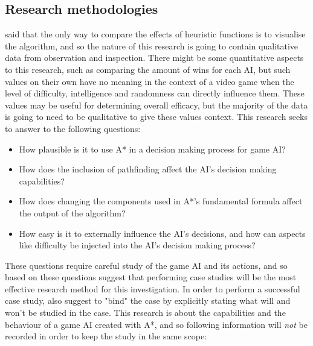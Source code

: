 \documentclass[11pt, a4paper]{report}
\begin{document}
\subsection{Research methodologies}
\label{subsec:researchMethodologies}

\citeauthor{millington2019ai} \parencite*[236]{millington2019ai} said that the only way to compare the effects of heuristic functions is to visualise the algorithm, and so the nature of this research is going to contain qualitative data from observation and inspection. There might be some quantitative aspects to this research, such as comparing the amount of wins for each AI, but such values on their own have no meaning in the context of a video game when the level of difficulty, intelligence and randomness can directly influence them. These values may be useful for determining overall efficacy, but the majority of the data is going to need to be qualitative to give these values context. This research seeks to answer to the following questions:

\begin{itemize}
\item How plausible is it to use A* in a decision making process for game AI?
\item How does the inclusion of pathfinding affect the AI's decision making capabilities?
\item How does changing the components used in A*'s fundamental formula affect the output of the algorithm?
\item How easy is it to externally influence the AI's decisions, and how can aspects like difficulty be injected into the AI's decision making process?
\end{itemize}

These questions require careful study of the game AI and its actions, and so based on these questions \citeauthor{baxter2008qualitative} \parencite*[545]{baxter2008qualitative} suggest that performing case studies will be the most effective research method for this investigation. In order to perform a successful case study, \citeauthor{baxter2008qualitative} \parencite*[546]{baxter2008qualitative} also suggest to "bind" the case by explicitly stating what will and won't be studied in the case. This research is about the capabilities and the behaviour of a game AI created with A*, and so following information will \emph{not} be recorded in order to keep the study in the same scope:
\end{document}
